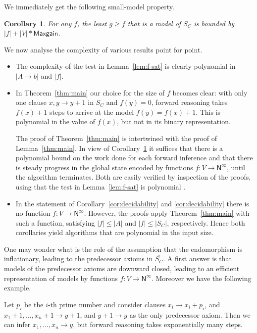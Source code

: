 \documentclass[11pt,a4paper]{article}
\newtheorem{corollary}[theorem]{Corollary}
\newcommand{\N}{\mathsf{N}}
\newcommand\Ninf{\N^\infty}
\newcommand\M{\mathsf{Maxgain}}
\newcommand\upS[1]{\overline{S_{#1}}}
\begin{document}
We immediately get the following small-model property.
\begin{corollary}\label{cor:small-model}
For any $f$, the least $g\geqslant f$ that is a model of $\upS{C}$
is bounded by $|f|+|V|*\M$.
\end{corollary}

We now analyse the complexity of various results point for point.

\begin{itemize}

\item\label{it:f-sat} The complexity of the test in Lemma~\ref{lem:f-sat}
is clearly polynomial in $|A\to b|$ and $|f|$.

\item In Theorem~\ref{thm:main} our choice for the size of $f$ becomes clear:
with only one clause $x,y \to y+1$ in $S_C$ and $f(y)=0$, forward reasoning
takes $f(x)+1$ steps to arrive at the model $f(y)=f(x)+1$.
This is polynomial in the value of $f(x)$, but not in its
binary representation.

The proof of Theorem~\ref{thm:main} is intertwined with the
proof of Lemma~\ref{thm:main}. In view of Corollary~\ref{cor:small-model}
it suffices that there is a polynomial bound on the work done for each 
forward inference and that there is steady progress in the global state encoded by
functions $f: V\to\Ninf$, until the algorithm terminates.
Both are easily verified by inspection of the proofs,
using that the test in Lemma~\ref{lem:f-sat} is polynomial . 
 
\item\label{it:Coros} In the statement of Corollary~\ref{cor:decidability}
and \ref{cor:decidability} there is no function $f: V\to\Ninf$. 
However, the proofs apply Theorem~\ref{thm:main} with such a function,
satisfying $|f| \leqslant |A|$ and $|f| \leqslant |S_C|$, respectively.
Hence both corollaries yield algorithms that are polynomial in the input size.

\end{itemize}

One may wonder what is the role of the assumption that the endomorphism
is inflationary, leading to the predecessor axioms in $\upS{C}$. A first
answer is that models of the predecessor axioms are downward closed,
leading to an efficient representation of models by functions $f: V\to\Ninf$.
Moreover we have the following example.

Let $p_i$ be the $i$-th prime number and consider clauses $x_i \to x_i + p_i$,
and $x_1+1,\ldots,x_n+1 \to y+1$, and $y+1 \to y$ as the only predecessor axiom.
Then we can infer $x_1,\ldots,x_n \to y$, but forward reasoning takes
exponentially many steps. 
\end{document}
